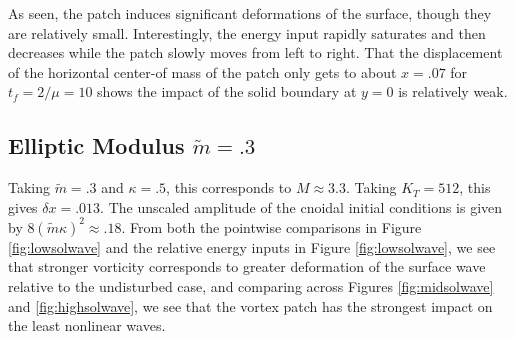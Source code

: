 \documentclass[a4paper,11pt]{article}
\begin{document}
As seen, the patch induces significant deformations of the surface, though they are relatively small.  Interestingly, the energy input rapidly saturates and then decreases while the patch slowly moves from left to right.  That the displacement of the horizontal center-of mass of the patch only gets to about $x=.07$ for $t_{f}=2/\mu = 10$ shows the impact of the solid boundary at $y=0$ is relatively weak.  
\subsection*{Elliptic Modulus $\tilde{m}=.3$}
Taking $\tilde{m}=.3$ and $\kappa = .5$, this corresponds to $M \approx 3.3$.  Taking $K_{T}=512$, this gives $\delta x = .013$.  The unscaled amplitude of the cnoidal initial conditions is given by $8(\tilde{m}\kappa)^{2}\approx .18$.  From both the pointwise comparisons in Figure \ref{fig:lowsolwave} and the relative energy inputs in Figure \ref{fig:lowsolwave}, we see that stronger vorticity corresponds to greater deformation of the surface wave relative to the undisturbed case, and comparing across Figures \ref{fig:midsolwave} and \ref{fig:highsolwave}, we see that the vortex patch has the strongest impact on the least nonlinear waves.  
\end{document}
